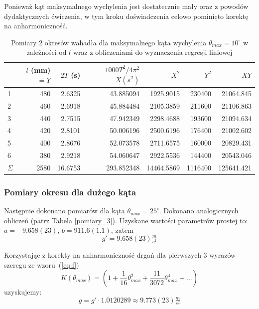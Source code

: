 \documentclass[a4paper]{article}
\newlength{\du}
\begin{document}
Ponieważ kąt maksymalnego wychylenia jest dostatecznie mały oraz z powodów dydaktycznych ćwiczenia,
w tym kroku doświadczenia celowo pominięto korektę na anharmoniczność.

\begin{table}[h!]
\centering
	\begin{tabular}{lrrrrrr}
	\toprule
	{} & $l$ (mm) $=Y$ &  $2T$ (s) & \small$1000T^2/4\pi^2$\normalsize$=X (s^2)$ & $X^2$ & $Y^2$ & $XY$ \\
	\midrule
	1 &     480 &  2.6325 &  43.885094 &  1925.9015 &  230400 &  21064.845 \\
	2 &     460 &  2.6918 &  45.884484 &  2105.3859 &  211600 &  21106.863 \\
	3 &     440 &  2.7515 &  47.942349 &  2298.4688 &  193600 &  21094.634 \\
	4 &     420 &  2.8101 &  50.006196 &  2500.6196 &  176400 &  21002.602 \\
	5 &     400 &  2.8676 &  52.073578 &  2711.6575 &  160000 &  20829.431 \\
	6 &     380 &  2.9218 &  54.060647 &  2922.5536 &  144400 &  20543.046 \\
	\midrule
	$\Sigma$ & 2580 & 16.6753 & 293.852348 & 14464.5869 & 1116400 & 125641.421 \\
	\end{tabular}
\caption{Pomiary 2 okresów wahadła dla maksymalnego kąta wychylenia $\theta_{max} = 10^\circ$ w  zależności od $l$ wraz z obliczeniami do wyznaczenia regresji liniowej}
\label{pomiary_2}
\end{table}




\subsubsection{Pomiary okresu dla dużego kąta}

Następnie dokonano pomiarów dla kąta $\theta_{max} = 25^\circ$. 
Dokonano analogicznych obliczeń (patrz Tabela \ref{pomiary_3}).
Uzyskane wartości parametrów prostej to: $a = -9.658(23)$, $b = 911.6(1.1)$,
zatem \[g' = 9.658(23)  \tfrac{m}{s^2}\]

Korzystając z korekty na anharmoniczność drgań dla pierwszych 3 wyrazów szeregu ze wzoru~(\ref{eq:f})
\[ K(\theta_{max}) = \left( 1 + \frac{1}{16}\theta^2_{max} + \frac{11}{3072}\theta^4_{max} + ... \right) \]
uzyskujemy: \[ g = g' \cdot 1.0120289 \approx 9.773(23) \tfrac{m}{s^2}\]
\end{document}
